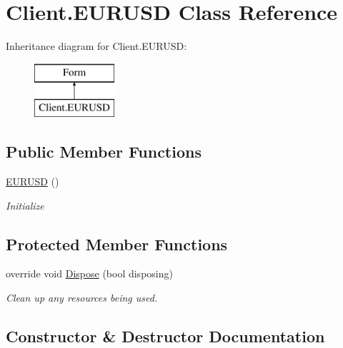 \hypertarget{class_client_1_1_e_u_r_u_s_d}{}\section{Client.\+E\+U\+R\+U\+SD Class Reference}
\label{class_client_1_1_e_u_r_u_s_d}
Inheritance diagram for Client.\+E\+U\+R\+U\+SD\+:\begin{figure}[H]
\begin{center}
\leavevmode
\includegraphics[height=2.000000cm]{class_client_1_1_e_u_r_u_s_d}
\end{center}
\end{figure}
\subsection*{Public Member Functions}
\begin{DoxyCompactItemize}
\item 
\hyperlink{class_client_1_1_e_u_r_u_s_d_a03384aa274a53d5a55802af42b037340}{E\+U\+R\+U\+SD} ()
\begin{DoxyCompactList}\small\item\em Initialize \end{DoxyCompactList}\end{DoxyCompactItemize}
\subsection*{Protected Member Functions}
\begin{DoxyCompactItemize}
\item 
override void \hyperlink{class_client_1_1_e_u_r_u_s_d_ac79778a2939989f2762ecbc06d90dbc6}{Dispose} (bool disposing)
\begin{DoxyCompactList}\small\item\em Clean up any resources being used. \end{DoxyCompactList}\end{DoxyCompactItemize}


\subsection{Constructor \& Destructor Documentation}
\hypertarget{class_client_1_1_e_u_r_u_s_d_a03384aa274a53d5a55802af42b037340}{}\label{class_client_1_1_e_u_r_u_s_d_a03384aa274a53d5a55802af42b037340} 
